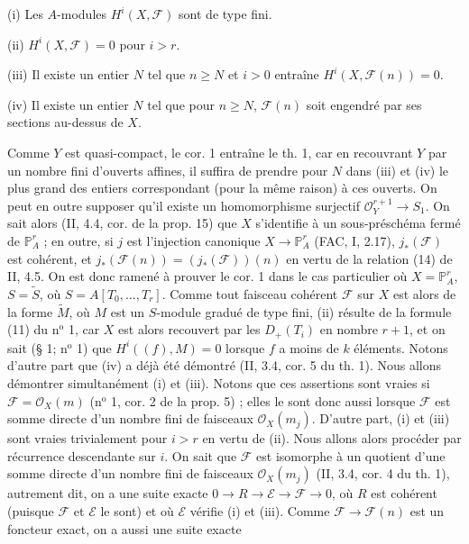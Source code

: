 (i) Les $A$-modules $H^i(X, \mathcal{F})$ sont de type fini.

(ii) $H^i(X, \mathcal{F}) = 0$ pour $i > r$.

\newpage



(iii) Il existe un entier $N$ tel que $n \ge N$ et $i > 0$ entraîne $H^i(X, \mathcal{F}(n)) = 0$.

(iv) Il existe un entier $N$ tel que pour $n \ge N$, $\mathcal{F}(n)$ soit engendré par ses sections au-dessus de $X$.

Comme $Y$ est quasi-compact, le cor. 1 entraîne le th. 1, car en recouvrant $Y$ par un nombre fini d'ouverts affines, il suffira de prendre pour $N$ dans (iii) et (iv) le plus grand des entiers correspondant (pour la même raison) à ces ouverts. On peut en outre supposer qu'il existe un homomorphisme surjectif $\mathcal{O}_Y^{r+1} \to S_1$. On sait alors (II, 4.4, cor. de la prop. 15) que $X$ s'identifie à un sous-préschéma fermé de $\mathbb{P}_A^r$ ; en outre, si $j$ est l'injection canonique $X \to \mathbb{P}_A^r$ (FAC, I, 2.17), $j_*(\mathcal{F})$ est cohérent, et $j_*(\mathcal{F}(n)) = (j_*(\mathcal{F}))(n)$ en vertu de la relation (14) de II, 4.5. On est donc ramené à prouver le cor. 1 dans le cas particulier où $X = \mathbb{P}_A^r$, $S = \tilde{S}$, où $S = A[T_0, \dots, T_r]$. Comme tout faisceau cohérent $\mathcal{F}$ sur $X$ est alors de la forme $\tilde{M}$, où $M$ est un $S$-module gradué de type fini, (ii) résulte de la formule (11) du n$^{\text{o}}$ 1, car $X$ est alors recouvert par les $D_+(T_i)$ en nombre $r+1$, et on sait (§ 1; n$^{\text{o}}$ 1) que $H^i((f), M) = 0$ lorsque $f$ a moins de $k$ éléments. Notons d'autre part que (iv) a déjà été démontré (II, 3.4, cor. 5 du th. 1). Nous allons démontrer simultanément (i) et (iii). Notons que ces assertions sont vraies si $\mathcal{F} = \mathcal{O}_X(m)$ (n$^{\text{o}}$ 1, cor. 2 de la prop. 5) ; elles le sont donc aussi lorsque $\mathcal{F}$ est somme directe d'un nombre fini de faisceaux $\mathcal{O}_X(m_j)$. D'autre part, (i) et (iii) sont vraies trivialement pour $i > r$ en vertu de (ii). Nous allons alors procéder par récurrence descendante sur $i$. On sait que $\mathcal{F}$ est isomorphe à un quotient d'une somme directe d'un nombre fini de faisceaux $\mathcal{O}_X(m_j)$ (II, 3.4, cor. 4 du th. 1), autrement dit, on a une suite exacte $0 \to R \to \mathcal{E} \to \mathcal{F} \to 0$, où $R$ est cohérent (puisque $\mathcal{F}$ et $\mathcal{E}$ le sont) et où $\mathcal{E}$ vérifie (i) et (iii). Comme $\mathcal{F} \to \mathcal{F}(n)$ est un foncteur exact, on a aussi une suite exacte

